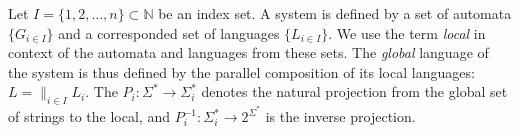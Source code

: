 \documentclass[a4paper, 10pt, conference]{ieeeconf} \IEEEoverridecommandlockouts
\begin{document}
Let $I = \{1,2,\ldots,n\} \subset  \mathbb{N}$ be an index set. A system is
defined by a set of automata $\{G_{i \in I}\}$ and a corresponded set
of languages $\{L_{i \in I}\}$. We use the term \emph{local} in context
of the automata and languages from these sets. The \emph{global} language of the
system is thus defined by the parallel composition of its local languages: $L =
\parallel_{i \in I} L_i$.
The $P_i : \Sigma^* \rightarrow \Sigma_i^*$ denotes the natural projection from
the global set of strings to the local, and $P_i^{-1} : \Sigma_i^* \rightarrow
2^{\Sigma^*}$ is the inverse projection.



% 
\end{document}
